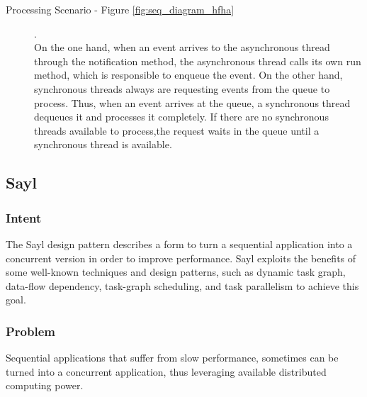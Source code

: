 
\begin{description}
	
	
	\item[Processing Scenario - Figure \ref{fig:seq_diagram_hfha}].\\ 
	On the one hand, when an event arrives to the asynchronous thread through the notification method, the asynchronous thread calls its own run method, which is responsible to enqueue the event. On the other hand, synchronous threads always are requesting events from the queue to process. Thus, when an event arrives at the queue, a synchronous thread dequeues it and processes it completely. If there are no synchronous threads available to process,the request waits in the queue until a synchronous thread is available.
	
\end{description}

\subsection{Sayl}
\label{sub-sec:sayl-template}

\subsubsection{Intent}

The Sayl design pattern describes a form to turn a sequential application into a concurrent version in order to improve performance. Sayl exploits the benefits of some well-known techniques and design patterns, such as dynamic task graph, data-flow dependency, task-graph scheduling, and task parallelism to achieve this goal.

\subsubsection{Problem}

Sequential applications that suffer from slow performance, sometimes can be turned into a concurrent application, thus leveraging available distributed computing power.

